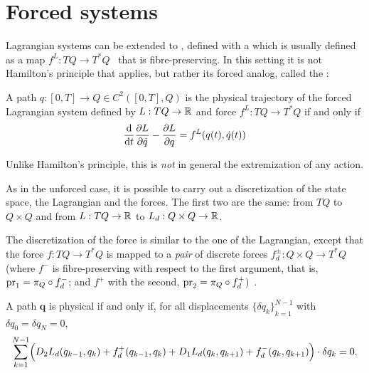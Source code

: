\chapter{Forced systems}\label{sec:forced-systems}

Lagrangian systems can be extended to , defined with a  which is usually defined as a map $f^L : TQ \to T^* Q$~\cite[\S4.1.1]{satomartindealmagroDiscreteMechanicsForced2020} that is fibre-preserving. In this setting it is not Hamilton's principle that applies, but rather its forced analog, called the :
\begin{definition}
	A path $q : [0, T] \to Q \in C^2([0, T], Q)$ is the physical trajectory of the forced Lagrangian system defined by $L: TQ \to {\mathbb{R}}$ and force $f^L : TQ \to T^*Q$ if and only if
	\[
		\odv{}{t} \pdv{L}{\dot{q}} - \pdv{L}{q} = f^L (q(t), \dot{q}(t))
	\]
\end{definition}
Unlike Hamilton's principle, this is \emph{not} in general the extremization of any action.

As in the unforced case, it is possible to carry out a discretization of the state space, the Lagrangian and the forces. The first two are the same: from $TQ$ to $Q \times Q$ and from $L : TQ \to {\mathbb{R}}$ to $L_d : Q \times Q \to {\mathbb{R}}$.

The discretization of the force is similar to the one of the Lagrangian, except that the force $f : TQ \to T^*Q$ is mapped to a \emph{pair} of discrete forces $f^\pm_d : Q \times Q \to T^*Q$ (where $f^-$ is fibre-preserving with respect to the first  argument, that is, $\hbox{pr}_1=\pi_Q \circ f_d^-$; and $f^+$ with the second, $\hbox{pr}_2=\pi_Q \circ f_d^+$)~\cite[\S3.2.1]{marsdenDiscreteMechanicsVariational2001}.

\begin{definition}\label{def:lagrange-dalembert}
	A path $\mathbf{q}$ is physical if and only if, for all displacements ${\{\delta q_k\}}_{k=1}^{N-1}$ with $\delta q_0 = \delta q_N = 0$,
	\begin{equation*}
		\sum_{k=1}^{N-1} \Bigl( D_{2} L_d(q_{k-1}, q_k) + f_d^+(q_{k-1}, q_k) + D_{1} L_d(q_k, q_{k+1}) + f_d^-(q_k, q_{k+1}) \Bigr) \cdot \delta q_k = 0.
	\end{equation*}
\end{definition}

